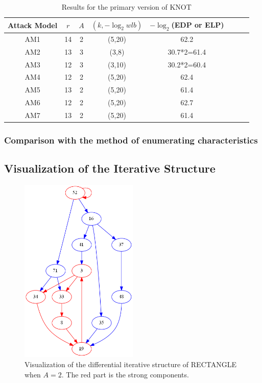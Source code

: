 \begin{table}
	\caption{Results for the primary version of KNOT}\label{tab:knot}
	\centering
	\begin{tabular}{|c|c|c|c|c|c|c|c|}
		\hline
		Attack Model & $r$ & $A$ & $(k,-\log_2wlb)$ & $-\log_2$(EDP or ELP)\\
		\hline
		AM1 & 14 & 2 & (5,20) & 62.2 \\
		AM2 & 13 & 3 & (3,8) & 30.7*2=61.4 \\
		AM3 & 12 & 3 & (3,10) & 30.2*2=60.4 \\
		AM4 & 12 & 2 & (5,20) & 62.4 \\
		AM5 & 13 & 2 & (5,20) & 61.4 \\
		AM6 & 12 & 2 & (5,20) & 62.7 \\
		AM7 & 13 & 2 & (5,20) & 61.4 \\
		\hline
	\end{tabular}
\end{table}

\subsubsection{Comparison with the method of enumerating characteristics}

\subsection{Visualization of the Iterative Structure}

\begin{figure}\label{fig:dis-rect}
    \centering
    \caption{Visualization of the differential iterative structure of RECTANGLE when $A=2$. The red part is the strong components. }
	\includegraphics[width=0.5\textwidth]{fig/test_circuits.png}
\end{figure}

